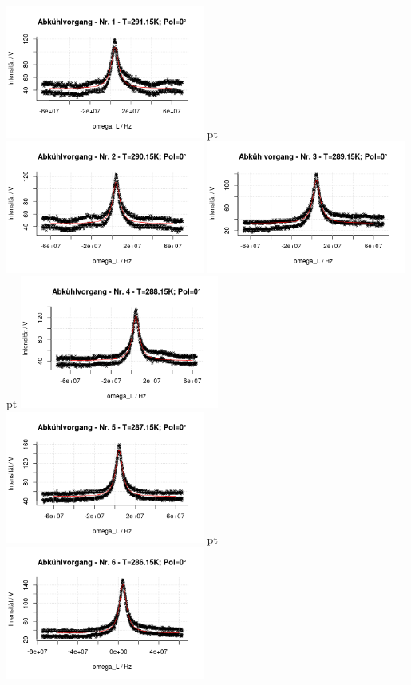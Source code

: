 \documentclass[12pt]{article}
\begin{document}
\begin{minipage}[h!]{\textwidth}
	\centering
	\includegraphics[width=0.49\textwidth]{figures/cold0-1.png} pt
	\includegraphics[width=0.49\textwidth]{figures/cold0-2.png}\vskip -10pt
	\includegraphics[width=0.49\textwidth]{figures/cold0-3.png} pt
	\includegraphics[width=0.49\textwidth]{figures/cold0-4.png}\vskip -10pt
	\includegraphics[width=0.49\textwidth]{figures/cold0-5.png} pt
	\includegraphics[width=0.49\textwidth]{figures/cold0-6.png}\vskip -10pt

\end{minipage}
\end{document}
